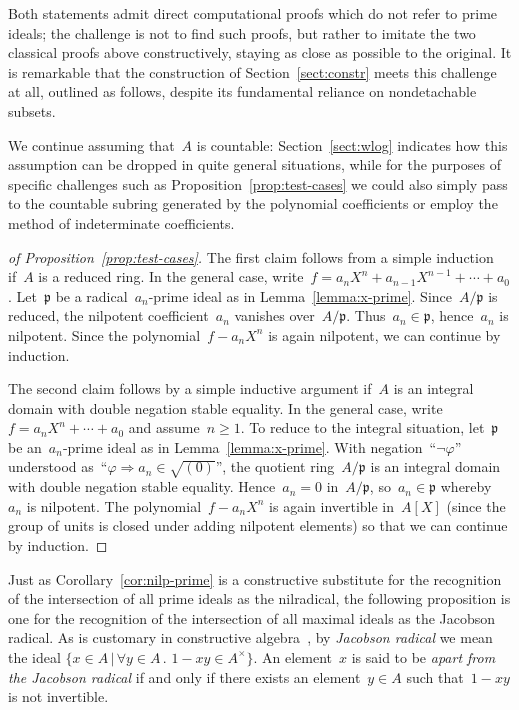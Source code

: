\documentclass[envcountsect,envcountsame,runningheads]{llncs}
\newcommand{\ppp}{\mathfrak{p}}
\renewcommand{\_}{\mathpunct{.}\,}
\begin{document}
Both statements admit direct computational proofs which do not
refer to prime ideals; the challenge is not to find such proofs, but rather to
imitate the two classical proofs above constructively, staying as close as
possible to the original. It is remarkable that the construction of
Section~\ref{sect:constr} meets this challenge at all, outlined as follows, despite its fundamental
reliance on nondetachable subsets.

We continue assuming that~$A$ is countable:
Section~\ref{sect:wlog} indicates how this assumption can be dropped in quite
general situations, while for the purposes of specific challenges such as Proposition~\ref{prop:test-cases} we could also
simply pass to the countable subring generated by the polynomial coefficients
or employ the method of indeterminate coefficients.

\begin{proof}[of Proposition~\ref{prop:test-cases}]
The first claim follows from a simple induction if~$A$ is a reduced
ring.
%
In the general case, write~$f = a_n X^n + a_{n-1} X^{n-1} + \cdots + a_0$. Let~$\ppp$
be a radical~$a_n$-prime ideal as in Lemma~\ref{lemma:x-prime}. Since~$A/\ppp$
is reduced, the nilpotent coefficient~$a_n$ vanishes over~$A/\ppp$. Thus~$a_n \in \ppp$,
hence~$a_n$ is nilpotent. Since the polynomial~$f - a_n X^n$ is again
nilpotent, we can continue by induction.

The second claim follows by a simple inductive argument if~$A$ is an
integral domain with double negation stable equality.
%
In the general case, write~$f = a_n X^n + \cdots + a_0$
and assume~$n \geq 1$. To reduce to the integral situation, let~$\ppp$ be
an~$a_n$-prime ideal as in Lemma~\ref{lemma:x-prime}.
With negation~``$\neg\varphi$'' understood as~``$\varphi \Rightarrow a_n \in
\sqrt{(0)}$'', the quotient ring~$A/\ppp$ is an integral domain with double
negation stable equality.
Hence~$a_n = 0$ in~$A/\ppp$, so~$a_n \in \ppp$ whereby~$a_n$ is nilpotent. The
polynomial~$f - a_n X^n$ is again invertible in~$A[X]$ (since the group of
units is closed under adding nilpotent elements) so that we can continue by
induction.
\end{proof}

Just as Corollary~\ref{cor:nilp-prime} is a constructive substitute
for the recognition of the intersection of all prime ideals as the nilradical,
the following proposition is one for the
recognition of the intersection of all maximal ideals as the Jacobson radical.
%
As is customary in constructive
algebra~\cite[Section~IX.1]{lombardi-quitte:constructive-algebra}, by
\emph{Jacobson radical} we mean the ideal
$\{ x \in A \,|\, \forall y \in A\_ 1 - xy \in A^\times \}$.
An element~$x$ is said to be \emph{apart from the Jacobson radical} if and only if
there exists an element~$y \in A$ such that~$1-xy$ is not invertible.
\end{document}
